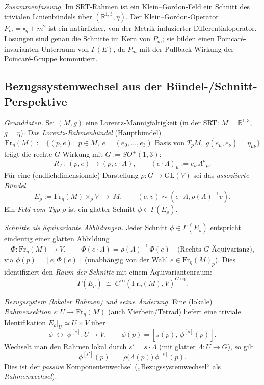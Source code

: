 \documentclass[10pt, letterpaper]{article}
\newcommand{\R}{\mathbb{R}}
\newcommand{\GL}{\mathrm{GL}}
\begin{document}
\emph{Zusammenfassung.}
Im SRT-Rahmen ist ein Klein–Gordon-Feld ein Schnitt des trivialen Linienbündels über $(\R^{1,3},\eta)$.
Der Klein–Gordon-Operator $P_m=\square_\eta+m^2$ ist ein natürlicher, von der Metrik induzierter
Differentialoperator. Lösungen sind genau die Schnitte im Kern von $P_m$; sie bilden einen
Poincaré-invarianten Unterraum von $\Gamma(E)$, da $P_m$ mit der Pullback-Wirkung der
Poincaré-Gruppe kommutiert.


\pagebreak


\subsection*{Bezugssystemwechsel aus der Bündel-/Schnitt-Perspektive}

\emph{Grunddaten.}
Sei $(M,g)$ eine Lorentz-Mannigfaltigkeit (in der SRT: $M=\R^{1,3}$, $g=\eta$).
Das \emph{Lorentz-Rahmenbündel} (Hauptbündel)
\[
\mathrm{Fr}_\eta(M):=\{(p,e)\mid p\in M,\ e=(e_0,\dots,e_3)\text{ Basis von }T_pM,\ g(e_\mu,e_\nu)=\eta_{\mu\nu}\}
\]
trägt die rechte $G$-Wirkung mit $G:=SO^+(1,3)$:
\[
R_\Lambda:\ (p,e)\mapsto (p,e\cdot\Lambda),\qquad (e\cdot\Lambda)_\mu:=e_\nu\,\Lambda^\nu{}_\mu.
\]
Für eine (endlichdimensionale) Darstellung $\rho:G\to\GL(V)$ sei das \emph{assoziierte Bündel}
\[
E_\rho:=\mathrm{Fr}_\eta(M)\times_\rho V\ \longrightarrow\ M,
\qquad (e,v)\sim (e\cdot\Lambda,\rho(\Lambda)^{-1}v).
\]
Ein \emph{Feld vom Typ $\rho$} ist ein glatter Schnitt $\phi\in\Gamma(E_\rho)$.

\emph{Schnitte als äquivariante Abbildungen.}
Jeder Schnitt $\phi\in\Gamma(E_\rho)$ entspricht eindeutig einer glatten Abbildung
\[
\Phi:\mathrm{Fr}_\eta(M)\to V,\qquad \Phi(e\cdot\Lambda)=\rho(\Lambda)^{-1}\,\Phi(e)
\quad\text{(Rechts-$G$-Äquivarianz),}
\]
via $\phi(p)=[e,\Phi(e)]$ (unabhängig von der Wahl $e\in\mathrm{Fr}_\eta(M)_p$).
Dies identifiziert den \emph{Raum der Schnitte} mit einem Äquivariantenraum:
\[
\Gamma(E_\rho)\ \cong\ C^\infty(\mathrm{Fr}_\eta(M),V)^{G\text{-eq}}.
\]

\emph{Bezugssystem (lokaler Rahmen) und seine Änderung.}
Eine (lokale) \emph{Rahmensektion} $s:U\to\mathrm{Fr}_\eta(M)$ (auch Vierbein/Tetrad) liefert
eine triviale Identifikation $E_\rho|_U\simeq U\times V$ über
\[
\phi\ \longleftrightarrow\ \phi^{[s]}:U\to V,\qquad
\phi(p)=[s(p),\,\phi^{[s]}(p)].
\]
Wechselt man den Rahmen lokal durch $s' = s\cdot\Lambda$ (mit glatter $\Lambda:U\to G$), so gilt
\[
\phi^{[s']}(p)\;=\;\rho\!\big(\Lambda(p)\big)\,\phi^{[s]}(p).
\]
Dies ist der \emph{passive} Komponentenwechsel („Bezugssystemwechsel“ als \emph{Rahmenwechsel}).
\end{document}

